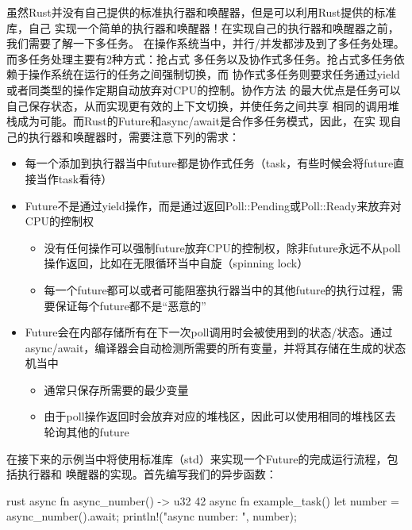 虽然Rust并没有自己提供的标准执行器和唤醒器，但是可以利用Rust提供的标准库，自己
实现一个简单的执行器和唤醒器！在实现自己的执行器和唤醒器之前，我们需要了解一下多任务。
在操作系统当中，并行/并发都涉及到了多任务处理。而多任务处理主要有2种方式：抢占式
多任务以及协作式多任务。抢占式多任务依赖于操作系统在运行的任务之间强制切换，而
协作式多任务则要求任务通过yield或者同类型的操作定期自动放弃对CPU的控制。协作方法
的最大优点是任务可以自己保存状态，从而实现更有效的上下文切换，并使任务之间共享
相同的调用堆栈成为可能。而Rust的Future和async/await是合作多任务模式，因此，在实
现自己的执行器和唤醒器时，需要注意下列的需求：
\begin{itemize}
  \item 每一个添加到执行器当中future都是协作式任务（task，有些时候会将future直接当作task看待）
  \item Future不是通过yield操作，而是通过返回Poll::Pending或Poll::Ready来放弃对CPU的控制权
  \begin{itemize}
    \item 没有任何操作可以强制future放弃CPU的控制权，除非future永远不从poll操作返回，比如在无限循环当中自旋（spinning lock）
    \item 每一个future都可以或者可能阻塞执行器当中的其他future的执行过程，需要保证每个future都不是“恶意的”
  \end{itemize}
  \item Future会在内部存储所有在下一次poll调用时会被使用到的状态/状态。通过async/await，编译器会自动检测所需要的所有变量，并将其存储在生成的状态机当中
  \begin{itemize}
    \item 通常只保存所需要的最少变量
    \item 由于poll操作返回时会放弃对应的堆栈区，因此可以使用相同的堆栈区去轮询其他的future
  \end{itemize}
\end{itemize}

在接下来的示例当中将使用标准库（std）来实现一个Future的完成运行流程，包括执行器和
唤醒器的实现。首先编写我们的异步函数：
\begin{code-block}{rust}
async fn async_number() -> u32 {
    42
}
async fn example_task() {
    let number = async_number().await;
    println!("async number: {}", number);
}
\end{code-block}

